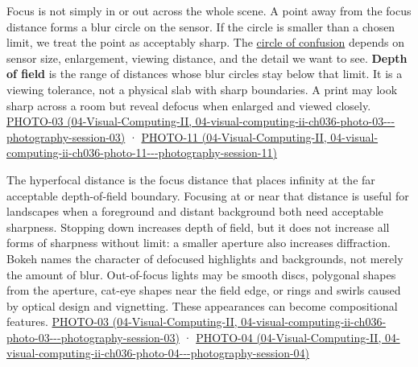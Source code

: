 Focus is not simply in or out across the whole scene. A point away from the focus distance forms a blur circle on the sensor. If the circle is smaller than a chosen limit, we treat the point as acceptably sharp. The \hyperref[appendix-21f8456e2629]{circle of confusion} depends on sensor size, enlargement, viewing distance, and the detail we want to see. \textbf{Depth of field} is the range of distances whose blur circles stay below that limit. It is a viewing tolerance, not a physical slab with sharp boundaries. A print may look sharp across a room but reveal defocus when enlarged and viewed closely. \href{../04-Visual-Computing-II/main.pdf\#nameddest=04-visual-computing-ii-ch036-photo-03---photography-session-03}{PHOTO-03 (04-Visual-Computing-II, 04-visual-computing-ii-ch036-photo-03-\/-\/-photography-session-03)} · \href{../04-Visual-Computing-II/main.pdf\#nameddest=04-visual-computing-ii-ch036-photo-11---photography-session-11}{PHOTO-11 (04-Visual-Computing-II, 04-visual-computing-ii-ch036-photo-11-\/-\/-photography-session-11)}

The hyperfocal distance is the focus distance that places infinity at the far acceptable depth-of-field boundary. Focusing at or near that distance is useful for landscapes when a foreground and distant background both need acceptable sharpness. Stopping down increases depth of field, but it does not increase all forms of sharpness without limit: a smaller aperture also increases diffraction. Bokeh names the character of defocused highlights and backgrounds, not merely the amount of blur. Out-of-focus lights may be smooth discs, polygonal shapes from the aperture, cat-eye shapes near the field edge, or rings and swirls caused by optical design and vignetting. These appearances can become compositional features. \href{../04-Visual-Computing-II/main.pdf\#nameddest=04-visual-computing-ii-ch036-photo-03---photography-session-03}{PHOTO-03 (04-Visual-Computing-II, 04-visual-computing-ii-ch036-photo-03-\/-\/-photography-session-03)} · \href{../04-Visual-Computing-II/main.pdf\#nameddest=04-visual-computing-ii-ch036-photo-04---photography-session-04}{PHOTO-04 (04-Visual-Computing-II, 04-visual-computing-ii-ch036-photo-04-\/-\/-photography-session-04)}

